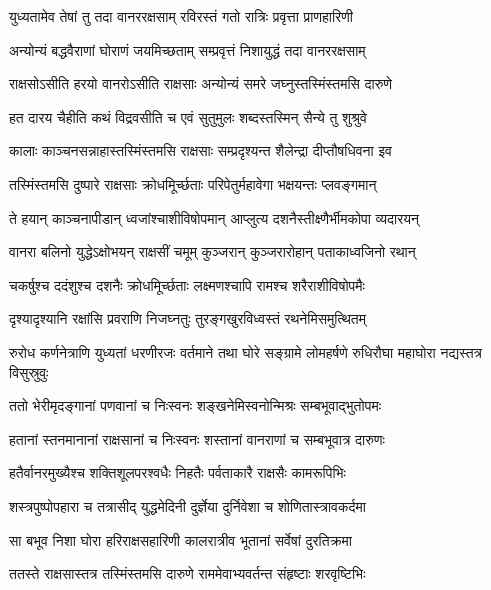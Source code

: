 
\twolineshloka
{युध्यतामेव तेषां तु तदा वानररक्षसाम्}
{रविरस्तं गतो रात्रिः प्रवृत्ता प्राणहारिणी} %

\twolineshloka
{अन्योन्यं बद्धवैराणां घोराणं जयमिच्छताम्}
{सम्प्रवृत्तं निशायुद्धं तदा वानररक्षसाम्} %

\twolineshloka
{राक्षसोऽसीति हरयो वानरोऽसीति राक्षसाः}
{अन्योन्यं समरे जघ्नुस्तस्मिंस्तमसि दारुणे} %

\twolineshloka
{हत दारय चैहीति कथं विद्रवसीति च}
{एवं सुतुमुलः शब्दस्तस्मिन् सैन्ये तु शुश्रुवे} %

\twolineshloka
{कालाः काञ्चनसन्नाहास्तस्मिंस्तमसि राक्षसाः}
{सम्प्रदृश्यन्त शैलेन्द्रा दीप्तौषधिवना इव} %

\twolineshloka
{तस्मिंस्तमसि दुष्पारे राक्षसाः क्रोधमूिर्च्छताः}
{परिपेतुर्महावेगा भक्षयन्तः प्लवङ्गमान्} %

\twolineshloka
{ते हयान् काञ्चनापीडान् ध्वजांश्चाशीविषोपमान्}
{आप्लुत्य दशनैस्तीक्ष्णैर्भीमकोपा व्यदारयन्} %

\twolineshloka
{वानरा बलिनो युद्धेऽक्षोभयन् राक्षसीं चमूम्}
{कुञ्जरान् कुञ्जरारोहान् पताकाध्वजिनो रथान्} %

\twolineshloka
{चकर्षुश्च ददंशुश्च दशनैः क्रोधमूिर्च्छताः}
{लक्ष्मणश्चापि रामश्च शरैराशीविषोपमैः} %

\twolineshloka
{दृश्यादृश्यानि रक्षांसि प्रवराणि निजघ्नतुः}
{तुरङ्गखुरविध्वस्तं रथनेमिसमुत्थितम्} %

\threelineshloka
{रुरोध कर्णनेत्राणि युध्यतां धरणीरजः}
{वर्तमाने तथा घोरे सङ्ग्रामे लोमहर्षणे}
{रुधिरौघा महाघोरा नद्यस्तत्र विसुस्रुवुः} %

\twolineshloka
{ततो भेरीमृदङ्गानां पणवानां च निःस्वनः}
{शङ्खनेमिस्वनोन्मिश्रः सम्बभूवाद्भुतोपमः} %

\twolineshloka
{हतानां स्तनमानानां राक्षसानां च निःस्वनः}
{शस्तानां वानराणां च सम्बभूवात्र दारुणः} %

\twolineshloka
{हतैर्वानरमुख्यैश्च शक्तिशूलपरश्वधैः}
{निहतैः पर्वताकारै राक्षसैः कामरूपिभिः} %

\twolineshloka
{शस्त्रपुष्पोपहारा च तत्रासीद् युद्धमेदिनी}
{दुर्ज्ञेया दुर्निवेशा च शोणितास्त्रावकर्दमा} %

\twolineshloka
{सा बभूव निशा घोरा हरिराक्षसहारिणी}
{कालरात्रीव भूतानां सर्वेषां दुरतिक्रमा} %

\twolineshloka
{ततस्ते राक्षसास्तत्र तस्मिंस्तमसि दारुणे}
{राममेवाभ्यवर्तन्त संहृष्टाः शरवृष्टिभिः} %

